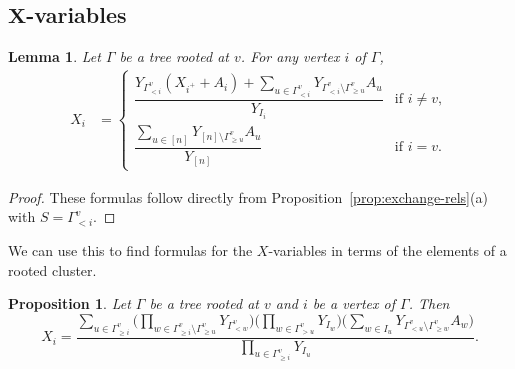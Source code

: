 \documentclass[10pt,a4paper]{amsart}
\numberwithin{equation}{section}
\newtheorem{Lemma}[Theorem]{Lemma}
\newtheorem{Proposition}[Theorem]{Proposition}
 { \theoremstyle{definition}
\newtheorem{Definition}[Theorem]{Definition}
\newtheorem{Note}[Theorem]{Note}
\newtheorem{Example}[Theorem]{Example}
\newtheorem{Remark}[Theorem]{Remark} }
\begin{document}
\subsection[X-variables]{$\boldsymbol{X}$-variables}\label{sec:X-formulas}
\begin{Lemma}\label{lem:X-formula-1}
Let $\Gamma$ be a tree rooted at $v$. For any vertex $i$ of $\Gamma$,
\begin{align*}
 X_i &= \begin{cases}
 \dfrac{Y_{\Gamma_{< i}^v}(X_{i^+}+A_i)+\sum_{u\in \Gamma_{< i}^v}Y_{\Gamma_{< i}^v\setminus\Gamma_{\geq u}^v}A_u}{Y_{I_i}} & \textrm{if } i \neq v, \\
 \dfrac{\sum_{u\in [n]}Y_{[n]\setminus\Gamma_{\geq u}^v}A_u}{Y_{[n]}} & \textrm{if } i = v.
 \end{cases}
\end{align*}
\end{Lemma}
\begin{proof}
These formulas follow directly from Proposition~\ref{prop:exchange-rels}(a) with $S=\Gamma_{< i}^v$.
\end{proof}
We can use this to find formulas for the $X$-variables in terms of the elements of a rooted cluster.
\begin{Proposition}\label{prop:X-formula-2}
Let $\Gamma$ be a tree rooted at $v$ and $i$ be a vertex of $\Gamma$. Then \[X_i=\frac{\sum_{u\in\Gamma_{\geq i}^v}\Big(\prod_{w\in\Gamma_{\geq i}^v\setminus\Gamma_{\geq u}^v} Y_{\Gamma_{< w}^v}\Big)\Big(\prod_{w\in\Gamma_{> u}^v} Y_{I_w}\Big)\Big(\sum_{w\in I_u}Y_{\Gamma_{< u}^v\setminus\Gamma_{\geq w}^v}A_w\Big)}{\prod_{u\in\Gamma_{\geq i}^v}Y_{I_u}}.\]
\end{Proposition}
\end{document}
